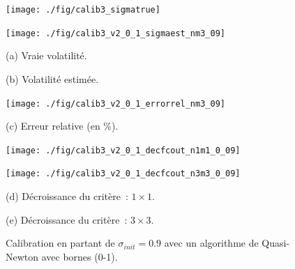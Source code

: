 \pagebreak

\begin{figure}[!htbp]

\begin{center}
\begin{minipage}{5.8cm}
\centerline{\texttt{[image: ./fig/calib3\_sigmatrue]}
} 
\end{minipage}
\hspace*{0.1cm}
\begin{minipage}{5.8cm}
\centerline{\texttt{[image: ./fig/calib3\_v2\_0\_1\_sigmaest\_nm3\_09]}
}
\end{minipage}
\end{center}

\begin{center}
\begin{minipage}{5.8cm}
(a) Vraie volatilit\'e.
\end{minipage}
\hspace*{0.1cm}
\begin{minipage}{5.8cm}
(b) Volatilit\'e estim\'ee.
\end{minipage}
\end{center}

\medskip

\begin{center}
\begin{minipage}{5.8cm}
\centerline{\texttt{[image: ./fig/calib3\_v2\_0\_1\_errorrel\_nm3\_09]}
}
\end{minipage}
\end{center}

\begin{center}
\begin{minipage}{5.8cm}
(c) Erreur relative (en \%).
\end{minipage}
\end{center}

\medskip

\begin{center}
\begin{minipage}{5.8cm}
\centerline{\texttt{[image: ./fig/calib3\_v2\_0\_1\_decfcout\_n1m1\_0\_09]}
}
\end{minipage}
\hspace*{0.1cm}
\begin{minipage}{5.8cm}
\centerline{\texttt{[image: ./fig/calib3\_v2\_0\_1\_decfcout\_n3m3\_0\_09]}
}
\end{minipage}
\end{center}

\begin{center}
\begin{minipage}{5.8cm}
(d) D\'ecroissance du crit\`ere~: $1 \times 1$.
\end{minipage}
\hspace*{0.1cm}
\begin{minipage}{5.8cm}
(e) D\'ecroissance du crit\`ere~: $3 \times 3$.
\end{minipage}
\end{center}

\caption{Calibration en partant de $\sigma_{init} = 0.9$ avec un 
algorithme de Quasi-Newton avec bornes (0-1).}
\label{FIG:CALIB3_V2_0_1_NM3_09}
\end{figure}

